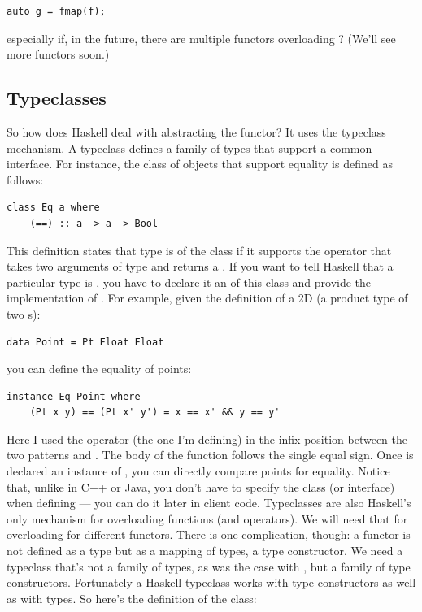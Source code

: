 \begin{verbatim}
auto g = fmap(f);
\end{verbatim}
especially if, in the future, there are multiple functors overloading
? (We'll see more functors soon.)

\subsection{Typeclasses}\label{typeclasses}

So how does Haskell deal with abstracting the functor? It uses the
typeclass mechanism. A typeclass defines a family of types that support
a common interface. For instance, the class of objects that support
equality is defined as follows:

\begin{verbatim}
class Eq a where
    (==) :: a -> a -> Bool
\end{verbatim}
This definition states that type  is of the class 
if it supports the operator \code{(==)} that takes two arguments of
type  and returns a . If you want to tell Haskell
that a particular type is , you have to declare it an
 of this class and provide the implementation of
\code{(==)}. For example, given the definition of a 2D 
(a product type of two s):

\begin{verbatim}
data Point = Pt Float Float
\end{verbatim}
you can define the equality of points:

\begin{verbatim}
instance Eq Point where
    (Pt x y) == (Pt x' y') = x == x' && y == y'
\end{verbatim}
Here I used the operator \code{(==)} (the one I'm defining) in the
infix position between the two patterns  and
. The body of the function follows the
single equal sign. Once  is declared an instance of
, you can directly compare points for equality. Notice that,
unlike in C++ or Java, you don't have to specify the  class
(or interface) when defining  --- you can do it later in
client code. Typeclasses are also Haskell's only mechanism for
overloading functions (and operators). We will need that for overloading
 for different functors. There is one complication, though:
a functor is not defined as a type but as a mapping of types, a type
constructor. We need a typeclass that's not a family of types, as was
the case with , but a family of type constructors.
Fortunately a Haskell typeclass works with type constructors as well as
with types. So here's the definition of the  class:

